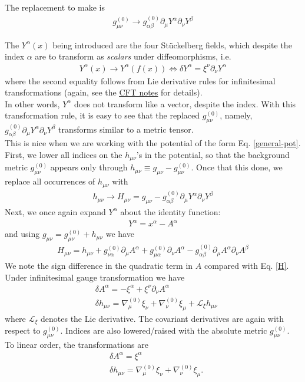 \documentclass{book}
\theoremstyle{definition}
\newcommand{\p}{\partial}
\newcommand{\lag}{\mathcal{L}}
\newcommand{\al}{\alpha}
\newcommand{\be}{\beta}
\begin{document}
The replacement to make is 
\begin{align}
\boxed{g_{\mu\nu}^{(0)} \to g_{\al\be}^{(0)} \p_\mu Y^\al \p_\nu Y^\beta}
\end{align}


The $Y^\al(x)$ being introduced are the four St\"{u}ckelberg fields, which despite the index $\al$ are to transform as \textit{scalars} under diffeomorphisms, i.e. 
\begin{align}
Y^\al(x) \to Y^\al(f(x)) \iff \delta Y^\al = \xi^\nu \p_\nu Y^\al
\end{align}
where the second equality follows from Lie derivative rules for infinitesimal transformations (again, see the \href{https://huanqbui.com/LaTeX projects/Classical_Fields_Theory/HuanBui_ClassicalFieldTheory.pdf}{\underline{CFT notes}} for details).\\

In other words, $Y^\al$ does not transform like a vector, despite the index. With this transformation rule, it is easy to see that the replaced $g^{(0)}_{\mu\nu}$, namely, $g_{\al\be}^{(0)} \p_\mu Y^\al \p_\nu Y^\beta$ transforms similar to a metric tensor. \\

This is nice when we are working with the potential of the form Eq. \eqref{general-pot}. First, we lower all indices on the $h_{\mu\nu}$'s in the potential, so that the background metric $g_{\mu\nu}^{(0)}$ appears only through $h_{\mu\nu} \equiv g_{\mu\nu} - g_{\mu\nu}^{(0)}$. Once that this done, we replace all occurrences of $h_{\mu\nu}$ with
\begin{align}
\boxed{h_{\mu\nu} \to H_{\mu\nu} = g_{\mu\nu} - g_{\al\be}^{(0)}\p_\mu Y^\al \p_\nu Y^\be}
\end{align}
Next, we once again expand $Y^\al$ about the identity function:
\begin{align}
Y^\al = x^\al - A^\al
\end{align}
and using $g_{\mu\nu} = g_{\mu\nu}^{(0)} + h_{\mu\nu}$ we have
\begin{align}
\boxed{H_{\mu\nu} = h_{\mu\nu} + g_{\nu\al}^{(0)} \p_\mu A^\al + g_{\mu\al}^{(0)}\p_\nu A^\al - g_{\al\be}^{(0)}\p_\mu A^\al \p_\nu A^\be    }
\end{align}
We note the sign difference in the quadratic term in $A$ compared with Eq. \eqref{H}. \\

Under infinitesimal gauge transformation we have
\begin{align}
&\delta A^\al = -\xi^\al + \xi^\nu \p_\nu A^\al\\
&\delta h_{\mu\nu} = \nabla_\mu^{(0)}\xi_\nu + \nabla_\nu^{(0)}\xi_\mu + \lag_\xi h_{\mu\nu}
\end{align}
where $\lag_\xi$ denotes the Lie derivative. The covariant derivatives are again with respect to $g_{\mu\nu}^{(0)}$. Indices are also lowered/raised with the absolute metric $g_{\mu\nu}^{(0)}$. To linear order, the transformations are
\begin{align}
&\delta A^\al = \xi^\al\\
&\delta h_{\mu\nu} =  \nabla_\mu^{(0)}\xi_\nu + \nabla_\nu^{(0)}\xi_\mu.
\end{align}
\end{document}

